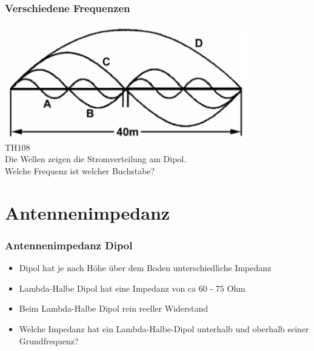 \begin{frame}
    \frametitle{Verschiedene Frequenzen}
        \begin{center}
        \includegraphics[width=0.8\textwidth]{a09/TH108.png} \\
        \tiny \hyperlink{refs}{\cite{bna}} TH108\\[1em] \large
        Die Wellen zeigen die Stromverteilung am Dipol. \\Welche Frequenz ist welcher Buchstabe?
    \end{center}
\end{frame}


\section*{Antennenimpedanz}

\begin{frame}
    \frametitle{Antennenimpedanz Dipol}
    \begin{center}
    	\begin{itemize}
		\item Dipol hat je nach Höhe über dem Boden unterschiedliche Impedanz \\[1em]
        \item Lambda-Halbe Dipol hat eine Impedanz von ca 60 - 75 Ohm \\[1em]
        \item Beim Lambda-Halbe Dipol rein reeller Widerstand \\[1em]
       	\item Welche Impedanz hat ein Lambda-Halbe-Dipol unterhalb und oberhalb seiner Grundfrequenz? \\[1em]
    	\end{itemize}
	\end{center}
\end{frame}

